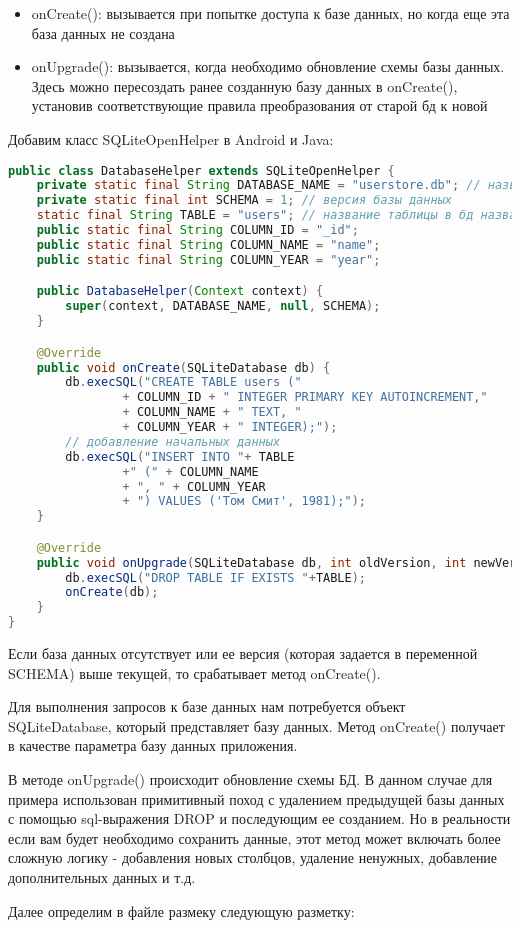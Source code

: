\begin{itemize}
	\item onCreate(): вызывается при попытке доступа к базе данных, но когда
		еще эта база данных не создана
	\item onUpgrade(): вызывается, когда необходимо обновление схемы базы
		данных. Здесь можно пересоздать ранее созданную базу данных в
		onCreate(), установив соответствующие правила преобразования от
		старой бд к новой
\end{itemize}

Добавим класс SQLiteOpenHelper в Android и Java:

\begin{lstlisting}[language=Java
	, label=lst:
	]
public class DatabaseHelper extends SQLiteOpenHelper {
	private static final String DATABASE_NAME = "userstore.db"; // название бд
	private static final int SCHEMA = 1; // версия базы данных
	static final String TABLE = "users"; // название таблицы в бд названия столбцов
	public static final String COLUMN_ID = "_id";
	public static final String COLUMN_NAME = "name";
	public static final String COLUMN_YEAR = "year";

	public DatabaseHelper(Context context) {
		super(context, DATABASE_NAME, null, SCHEMA);
	}

	@Override
	public void onCreate(SQLiteDatabase db) {
		db.execSQL("CREATE TABLE users ("
				+ COLUMN_ID + " INTEGER PRIMARY KEY AUTOINCREMENT,"
				+ COLUMN_NAME + " TEXT, "
				+ COLUMN_YEAR + " INTEGER);");
		// добавление начальных данных
		db.execSQL("INSERT INTO "+ TABLE
				+" (" + COLUMN_NAME
				+ ", " + COLUMN_YEAR
				+ ") VALUES ('Том Смит', 1981);");
	}

	@Override
	public void onUpgrade(SQLiteDatabase db, int oldVersion, int newVersion) {
		db.execSQL("DROP TABLE IF EXISTS "+TABLE);
		onCreate(db);
	}
}
\end{lstlisting}

Если база данных отсутствует или ее версия (которая задается в переменной
SCHEMA) выше текущей, то срабатывает метод onCreate().\par
Для выполнения запросов к базе данных нам потребуется объект
SQLiteDatabase, который представляет базу данных. Метод onCreate()
получает в качестве параметра базу данных приложения.\par
В методе onUpgrade() происходит обновление схемы БД. В данном случае
для примера использован примитивный поход с удалением предыдущей базы
данных с помощью sql-выражения DROP и последующим ее созданием. Но в
реальности если вам будет необходимо сохранить данные, этот метод может
включать более сложную логику - добавления новых столбцов, удаление
ненужных, добавление дополнительных данных и т.д.\par
Далее определим в файле размеку следующую разметку:

